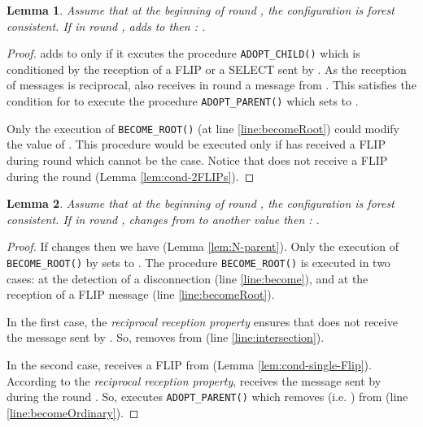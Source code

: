 \documentclass[twocolumn]{article}
\newtheorem{lemma}{Lemma}
\newcommand{\depends}[1]{}
\begin{document}
\begin{lemma}
  \label{lem:add_child_add_parent}
Assume that at the beginning of round , the configuration is forest consistent. If in round ,  adds  to  then  : .
\depends{\ref{lem:cond-2FLIPs}}
\end{lemma}
\begin{proof}
  adds  to  only if it excutes the procedure 
\texttt{ADOPT\_CHILD()}
 which is conditioned by the reception of a FLIP or a SELECT 
sent by .
As the reception of messages is reciprocal, 
 also receives in round  a message from . This satisfies the condition for  to execute the procedure 
\texttt{ADOPT\_PARENT()} which sets  to .



Only the execution of \texttt{BECOME\_ROOT()} (at line \ref{line:becomeRoot}) 
could modify the value of .
This procedure would be executed only if  has received
 a FLIP during round  which cannot be the case.
 Notice that  does not receive a FLIP during the round  (Lemma \ref{lem:cond-2FLIPs}).
 \end{proof}


\begin{lemma}
  \label{lem:rem_parent_rem_child}
Assume that at the beginning of round , the configuration is forest consistent. If in round ,  changes  from  to another value then 
 : 
.
\end{lemma}

\begin{proof}
If  changes  then we have  (Lemma \ref{lem:N-parent}).
Only the execution of \texttt{BECOME\_ROOT()} by  sets  
to . The procedure \texttt{BECOME\_ROOT()} is executed
in two cases: at the detection of a disconnection (line \ref{line:become}), and
at the reception of a FLIP message (line \ref{line:becomeRoot}).

In the first case, the \textit{reciprocal reception property} ensures that  
does not receive the message sent by .
So,   removes  from  (line \ref{line:intersection}).

In the second case,  receives a FLIP from  (Lemma 
 \ref{lem:cond-single-Flip}).
According to the \textit{reciprocal reception property},  receives the message sent by  during the round .
So,  executes \texttt{ADOPT\_PARENT()} which removes 
 (i.e. ) from  (line \ref{line:becomeOrdinary}).
 \end{proof}
\end{document}
